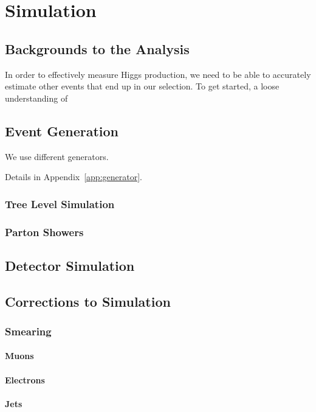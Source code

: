\chapter{Simulation} \label{ch:simulation}

\section{Backgrounds to the Analysis}

In order to effectively measure Higgs production,
we need to be able to accurately estimate other events
that end up in our selection.
To get started, a loose understanding of 

\section{Event Generation}

We use different generators.

Details in Appendix~\ref{app:generator}.

\subsection{Tree Level Simulation}

\subsection{Parton Showers}

\section{Detector Simulation}

\section{Corrections to Simulation}

\subsection{Smearing}

\subsubsection{Muons}

\subsubsection{Electrons}

\subsubsection{Jets}
